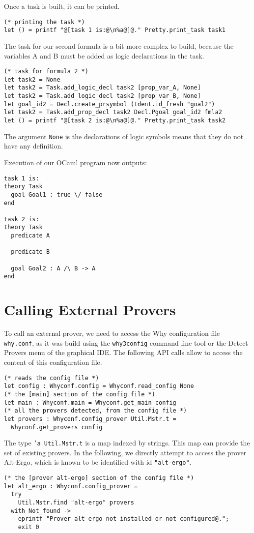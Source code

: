 Once a task is built, it can be printed.
\begin{verbatim}
(* printing the task *)
let () = printf "@[task 1 is:@\n%a@]@." Pretty.print_task task1
\end{verbatim}

The task for our second formula is a bit more complex to build, because
the variables A and B must be added as logic declarations in the task.
\begin{verbatim}
(* task for formula 2 *)
let task2 = None
let task2 = Task.add_logic_decl task2 [prop_var_A, None]
let task2 = Task.add_logic_decl task2 [prop_var_B, None]
let goal_id2 = Decl.create_prsymbol (Ident.id_fresh "goal2")
let task2 = Task.add_prop_decl task2 Decl.Pgoal goal_id2 fmla2
let () = printf "@[task 2 is:@\n%a@]@." Pretty.print_task task2
\end{verbatim}
The argument \texttt{None} is the declarations of logic symbols means
that they do not have any definition.

Execution of our OCaml program now outputs:
\begin{verbatim}
task 1 is:
theory Task
  goal Goal1 : true \/ false
end

task 2 is:
theory Task
  predicate A

  predicate B

  goal Goal2 : A /\ B -> A
end
\end{verbatim}

\section{Calling External Provers}

To call an external prover, we need to access the Why configuration
file \texttt{why.conf}, as it was build using the \texttt{why3config}
command line tool or the \textsf{Detect Provers} menu of the graphical
IDE. The following API calls allow to access the content of this
configuration file.
\begin{verbatim}
(* reads the config file *)
let config : Whyconf.config = Whyconf.read_config None
(* the [main] section of the config file *)
let main : Whyconf.main = Whyconf.get_main config
(* all the provers detected, from the config file *)
let provers : Whyconf.config_prover Util.Mstr.t =
  Whyconf.get_provers config
\end{verbatim}
The type \texttt{'a Util.Mstr.t} is a map indexed by strings. This map
can provide the set of existing provers. In the following, we directly
attempt to access the prover Alt-Ergo, which is known to be identified
with id \texttt{"alt-ergo"}.
\begin{verbatim}
(* the [prover alt-ergo] section of the config file *)
let alt_ergo : Whyconf.config_prover =
  try
    Util.Mstr.find "alt-ergo" provers
  with Not_found ->
    eprintf "Prover alt-ergo not installed or not configured@.";
    exit 0
\end{verbatim}

